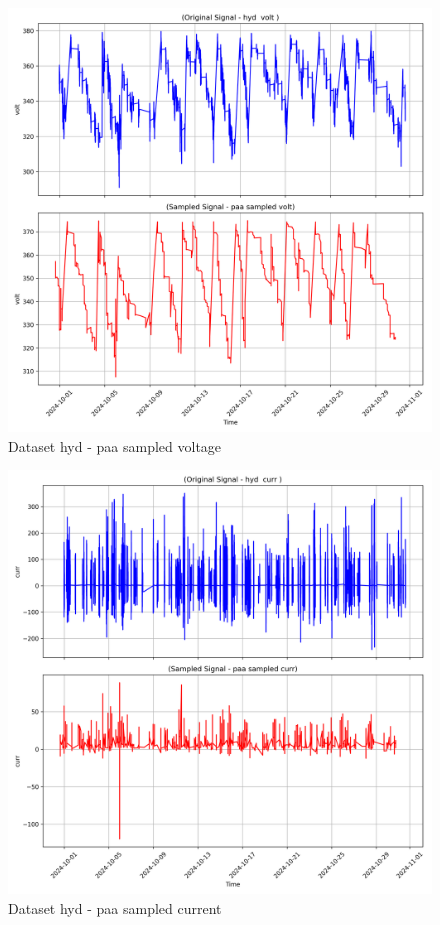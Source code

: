 \begin{figure}
    \centering
    \includegraphics[width=1\linewidth]{screenshots/hyd/paa_sampled_volt_screenshot.png}
    \caption{Dataset hyd - paa sampled voltage }
    \label{fig:hyd_paa_sampled_volt_screenshot}
\end{figure}
\begin{figure}
    \centering
    \includegraphics[width=1\linewidth]{screenshots/hyd/paa_sampled_curr_screenshot.png}
    \caption{Dataset hyd - paa sampled current }
    \label{fig:hyd_paa_sampled_curr_screenshot}
\end{figure}
